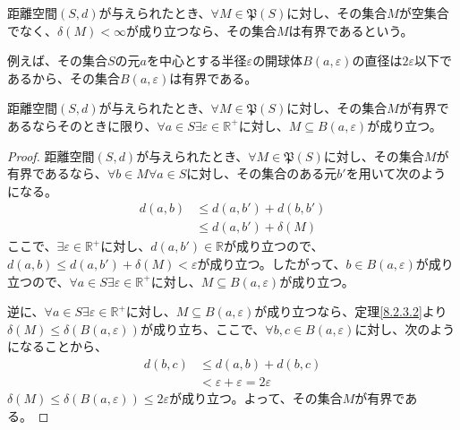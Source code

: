 \documentclass[dvipdfmx]{jsarticle}
\begin{document}
\begin{dfn}
距離空間$(S,d)$が与えられたとき、$\forall M \in \mathfrak{P}(S)$に対し、その集合$M$が空集合でなく、$\delta(M) < \infty$が成り立つなら、その集合$M$は有界であるという。
\end{dfn}\par
例えば、その集合$S$の元$a$を中心とする半径$\varepsilon$の開球体$B(a,\varepsilon)$の直径は$2\varepsilon$以下であるから、その集合$B(a,\varepsilon)$は有界である。
\begin{thm}\label{8.2.3.3}
距離空間$(S,d)$が与えられたとき、$\forall M \in \mathfrak{P}(S)$に対し、その集合$M$が有界であるならそのときに限り、$\forall a \in S\exists\varepsilon \in \mathbb{R}^{+}$に対し、$M \subseteq B(a,\varepsilon)$が成り立つ。
\end{thm}
\begin{proof}
距離空間$(S,d)$が与えられたとき、$\forall M \in \mathfrak{P}(S)$に対し、その集合$M$が有界であるなら、$\forall b \in M\forall a \in S$に対し、その集合のある元$b'$を用いて次のようになる。
\begin{align*}
d(a,b) &\leq d\left( a,b' \right) + d\left( b,b' \right)\\
&\leq d\left( a,b' \right) + \delta(M)
\end{align*}
ここで、$\exists\varepsilon \in \mathbb{R}^{+}$に対し、$d\left( a,b' \right) \in \mathbb{R}$が成り立つので、$d(a,b) \leq d\left( a,b' \right) + \delta(M) < \varepsilon$が成り立つ。したがって、$b \in B(a,\varepsilon)$が成り立つので、$\forall a \in S\exists\varepsilon \in \mathbb{R}^{+}$に対し、$M \subseteq B(a,\varepsilon)$が成り立つ。\par
逆に、$\forall a \in S\exists\varepsilon \in \mathbb{R}^{+}$に対し、$M \subseteq B(a,\varepsilon)$が成り立つなら、定理\ref{8.2.3.2}より$\delta(M) \leq \delta\left( B(a,\varepsilon) \right)$が成り立ち、ここで、$\forall b,c \in B(a,\varepsilon)$に対し、次のようになることから、
\begin{align*}
d(b,c) &\leq d(a,b) + d(b,c)\\
&< \varepsilon + \varepsilon = 2\varepsilon
\end{align*}
$\delta(M) \leq \delta\left( B(a,\varepsilon) \right) \leq 2\varepsilon$が成り立つ。よって、その集合$M$が有界である。
\end{proof}
\end{document}
